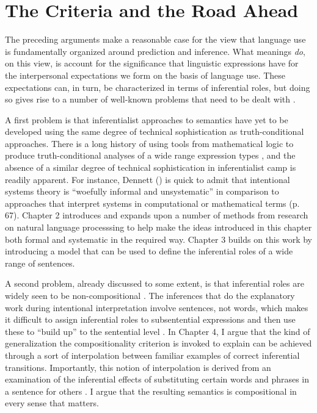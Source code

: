 \section{The Criteria and the Road Ahead}

The preceding arguments make a reasonable case for the view that language use is fundamentally organized around prediction and inference. What meanings \textit{do}, on this view, is account for the significance that linguistic expressions have for the interpersonal expectations we form on the basis of language use. These expectations can, in turn, be characterized in terms of inferential roles, but doing so gives rise to a number of well-known problems that need to be dealt with \citep{FodorLepore:1991,FodorLepore:2002}.

A first problem is that inferentialist approaches to semantics have yet to be developed using the same degree of technical sophistication as truth-conditional approaches. There is a long history of using tools from mathematical logic to produce truth-conditional analyses of a wide range expression types \citep[e.g.,][]{Carpenter:1997}, and the absence of a similar degree of technical sophistication in inferentialist camp is readily apparent. For instance, Dennett (\citeyear{Dennett:1987}) is quick to admit that intentional systems theory is ``woefully informal and unsystematic'' in comparison to approaches that interpret systems in computational or mathematical terms (p. 67). Chapter 2 introduces and expands upon a number of methods from research on natural language processsing to help make the ideas introduced in this chapter both formal and systematic in the required way. Chapter 3 builds on this work by introducing a model that can be used to define the inferential roles of a wide range of sentences. 

A second problem, already discussed to some extent, is that inferential roles are widely seen to be non-compositional \citep{FodorLepore:2002,Fodor:1998,MargolisLaurence:1999}. The inferences that do the explanatory work during intentional interpretation involve sentences, not words, which makes it difficult to assign inferential roles to subsentential expressions and then use these to ``build up'' to the sentential level \citep{Brandom:1994}. In Chapter 4, I argue that the kind of generalization the compositionality criterion is invoked to explain can be achieved through a sort of interpolation between familiar examples of correct inferential transitions. Importantly, this notion of interpolation is derived from an examination of the inferential effects of substituting certain words and phrases in a sentence for others \citep{Brandom:1994}. I argue that the resulting semantics is compositional in every sense that matters.

